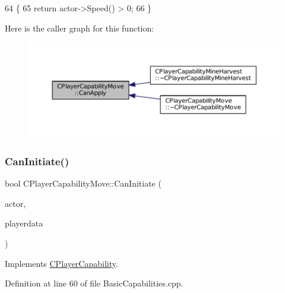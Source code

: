\begin{DoxyCode}
64                                                                                                            
                                                 \{
65     \textcolor{keywordflow}{return} actor->Speed() > 0;
66 \}
\end{DoxyCode}
Here is the caller graph for this function\+:\nopagebreak
\begin{figure}[H]
\begin{center}
\leavevmode
\includegraphics[width=350pt]{classCPlayerCapabilityMove_a76cbb0fa4051961c00e3169d11d76568_icgraph}
\end{center}
\end{figure}
\hypertarget{classCPlayerCapabilityMove_aef25bc0d224e993c46f5cd4cd6b8b7c8}{}\label{classCPlayerCapabilityMove_aef25bc0d224e993c46f5cd4cd6b8b7c8} 
\subsubsection{\texorpdfstring{Can\+Initiate()}{CanInitiate()}}
{\footnotesize\ttfamily bool C\+Player\+Capability\+Move\+::\+Can\+Initiate (\begin{DoxyParamCaption}\item[{std\+::shared\+\_\+ptr$<$ \hyperlink{classCPlayerAsset}{C\+Player\+Asset} $>$}]{actor,  }\item[{std\+::shared\+\_\+ptr$<$ \hyperlink{classCPlayerData}{C\+Player\+Data} $>$}]{playerdata }\end{DoxyParamCaption})\hspace{0.3cm}{\ttfamily [virtual]}}



Implements \hyperlink{classCPlayerCapability_aa83b1e1fcaff2985c378132d679154ea}{C\+Player\+Capability}.



Definition at line 60 of file Basic\+Capabilities.\+cpp.



